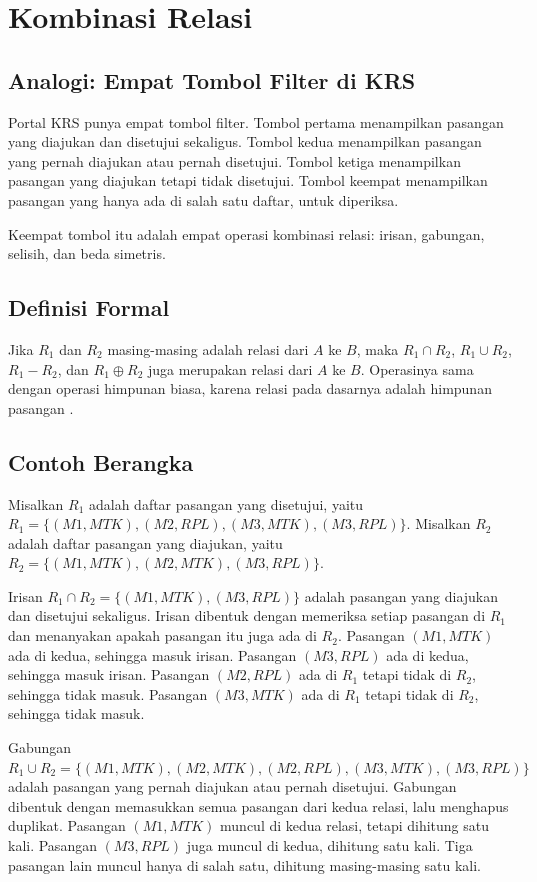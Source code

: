 \documentclass[11pt,a4paper]{article}
\begin{document}
\section{Kombinasi Relasi}

\subsection{Analogi: Empat Tombol Filter di KRS}

Portal KRS punya empat tombol filter. Tombol pertama menampilkan pasangan yang diajukan dan disetujui sekaligus. Tombol kedua menampilkan pasangan yang pernah diajukan atau pernah disetujui. Tombol ketiga menampilkan pasangan yang diajukan tetapi tidak disetujui. Tombol keempat menampilkan pasangan yang hanya ada di salah satu daftar, untuk diperiksa.

Keempat tombol itu adalah empat operasi kombinasi relasi: irisan, gabungan, selisih, dan beda simetris.

\subsection{Definisi Formal}

Jika $R_1$ dan $R_2$ masing-masing adalah relasi dari $A$ ke $B$, maka $R_1 \cap R_2$, $R_1 \cup R_2$, $R_1-R_2$, dan $R_1 \oplus R_2$ juga merupakan relasi dari $A$ ke $B$. Operasinya sama dengan operasi himpunan biasa, karena relasi pada dasarnya adalah himpunan pasangan \cite{rosen}.

\subsection{Contoh Berangka}

Misalkan $R_1$ adalah daftar pasangan yang disetujui, yaitu $R_1=\{(M1,MTK),(M2,RPL),(M3,MTK),(M3,RPL)\}$. Misalkan $R_2$ adalah daftar pasangan yang diajukan, yaitu $R_2=\{(M1,MTK),(M2,MTK),(M3,RPL)\}$.

Irisan $R_1 \cap R_2=\{(M1,MTK),(M3,RPL)\}$ adalah pasangan yang diajukan dan disetujui sekaligus. Irisan dibentuk dengan memeriksa setiap pasangan di $R_1$ dan menanyakan apakah pasangan itu juga ada di $R_2$. Pasangan $(M1,MTK)$ ada di kedua, sehingga masuk irisan. Pasangan $(M3,RPL)$ ada di kedua, sehingga masuk irisan. Pasangan $(M2,RPL)$ ada di $R_1$ tetapi tidak di $R_2$, sehingga tidak masuk. Pasangan $(M3,MTK)$ ada di $R_1$ tetapi tidak di $R_2$, sehingga tidak masuk.

Gabungan $R_1 \cup R_2=\{(M1,MTK),(M2,MTK),(M2,RPL),(M3,MTK),(M3,RPL)\}$ adalah pasangan yang pernah diajukan atau pernah disetujui. Gabungan dibentuk dengan memasukkan semua pasangan dari kedua relasi, lalu menghapus duplikat. Pasangan $(M1,MTK)$ muncul di kedua relasi, tetapi dihitung satu kali. Pasangan $(M3,RPL)$ juga muncul di kedua, dihitung satu kali. Tiga pasangan lain muncul hanya di salah satu, dihitung masing-masing satu kali.
\end{document}
